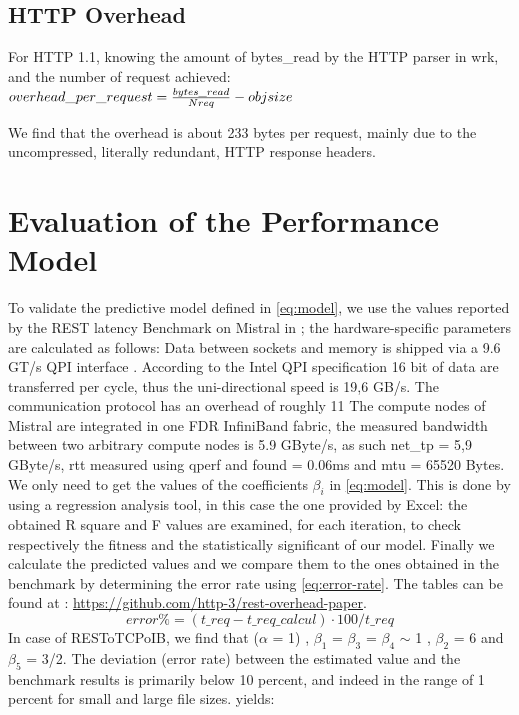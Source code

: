 \documentclass[runningheads]{llncs}
\begin{document}
\subsection{HTTP Overhead}

For HTTP 1.1, knowing the amount of bytes\_read by the HTTP parser in wrk, and the number of request achieved:
$ overhead\_per\_request=\frac{bytes\_read}{Nreq} - obj\-size $

We find that the overhead is about 233 bytes per request, mainly due to the uncompressed, literally redundant, HTTP response headers.
\section{Evaluation of the Performance Model} \label{sec:evaluation}
To validate the predictive model defined in \cref{eq:model}, we use the values reported by the REST latency Benchmark on Mistral in ; the hardware-specific parameters are calculated as follows:
Data between sockets and memory is shipped via a 9.6 GT/s QPI interface \cite{intel-xeon}. According to the Intel QPI specification \cite{intel-qpi} 16 bit of data are transferred per cycle, thus the uni-directional speed is 19,6 GB/s. The communication protocol has an overhead of roughly 11 %
The compute nodes of Mistral are integrated in one FDR InfiniBand fabric, the measured bandwidth between two arbitrary compute nodes is 5.9 GByte/s, as such net\_tp = 5,9 GByte/s, rtt measured using qperf and found = 0.06ms and mtu = 65520 Bytes.
We only need to get the values of the coefficients $\beta_i$ in \cref{eq:model}. This is done by using a regression analysis tool, in this case the one provided by Excel: the obtained R square and F values are examined, for each iteration, to check respectively the fitness and the statistically significant of our model. Finally we calculate the predicted values and we compare them to the ones obtained in the benchmark by determining the error rate using \cref{eq:error-rate}. The tables can be found at : \href{https://github.com/http-3/rest-overhead-paper}{https://github.com/http-3/rest-overhead-paper}.
\begin{equation}
 error\%=(t\_req -t\_req\_calcul)\cdot100/t\_req
\label{eq:error-rate}
\end{equation}
In case of RESToTCPoIB, we find that ($\alpha$ = 1) , $\beta_1$ = $\beta_3$ = $\beta_4$ $\sim$ 1 , $\beta_2$ = 6 and $\beta_5$ = 3/2. 
The deviation (error rate) between the estimated value and the benchmark results is primarily below 10 percent, and indeed in the range of 1 percent for small and large file sizes. yields:
\end{document}
